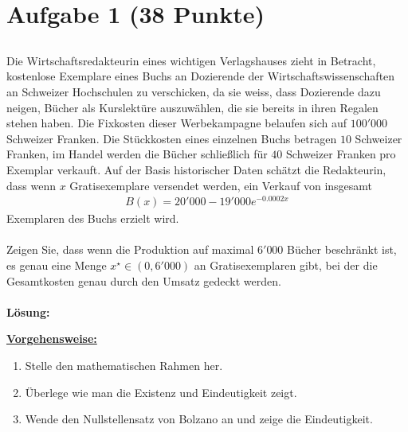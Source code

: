 \vspace{1cm}
\renewcommand{\labelenumi}{\theenumi.}
\section*{Aufgabe 1 (38 Punkte)}
\vspace{0.4cm}
\subsection*{} 
Die Wirtschaftsredakteurin eines wichtigen Verlagshauses zieht in Betracht,
kostenlose Exemplare eines Buchs an Dozierende der Wirtschaftswissenschaften an Schweizer Hochschulen zu verschicken, da sie weiss, dass Dozierende dazu neigen, Bücher als Kurslektüre auszuwählen, die sie bereits in ihren Regalen stehen haben. Die Fixkosten dieser Werbekampagne belaufen sich auf $100'000$ Schweizer Franken.
Die Stückkosten eines einzelnen Buchs betragen $10$ Schweizer Franken, im Handel werden die Bücher schließlich für $40$ Schweizer Franken pro Exemplar verkauft.
Auf der Basis historischer Daten schätzt die Redakteurin, dass wenn $x$ Gratisexemplare versendet werden, ein Verkauf von insgesamt
\begin{align*}
	B(x) = 20'000 - 19'000 e^{-0.0002 x }
\end{align*}
Exemplaren des Buchs erzielt wird. \\
\\
Zeigen Sie, dass wenn die Produktion auf maximal $6'000$ Bücher beschränkt ist, es genau eine Menge $ x^\star \in (0, 6'000)$ an Gratisexemplaren gibt, bei der die Gesamtkosten genau durch den Umsatz gedeckt werden.
\
\\ \\
\textbf{Lösung:}
\begin{mdframed}
\underline{\textbf{Vorgehensweise:}}
\renewcommand{\labelenumi}{\theenumi.}
\begin{enumerate}
\item 
Stelle den mathematischen Rahmen her.
\item
Überlege wie man die Existenz und Eindeutigkeit zeigt.
\item
Wende den Nullstellensatz von Bolzano an und zeige die Eindeutigkeit. 

\end{enumerate}
\end{mdframed}

